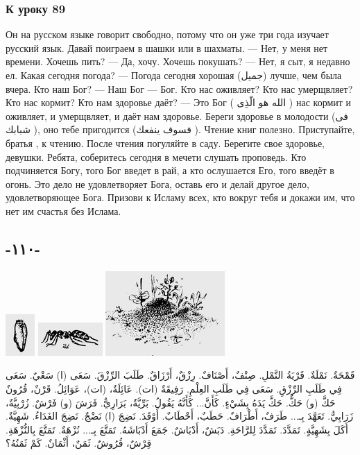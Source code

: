 \documentclass[a5paper]{article}
\begin{document}
\subsubsection[К уроку 89]{К уроку 89}
Он на русском языке говорит свободно, потому что он уже три года изучает русский язык. Давай поиграем в шашки или в шахматы. — Нет, у меня нет времени. Хочешь пить? — Да, хочу. Хочешь поку­шать? — Нет, я сыт, я недавно ел. Какая сегодня погода? — Погода сегодня хорошая (جميل) лучше, чем была вчера. Кто наш Бог? — Наш Бог — Бог. Кто нас оживляет? Кто нас умерщвляет? Кто нас кормит? Кто нам здоровье даёт? — Это Бог ( الله هو الّذِى ) нас кормит и оживляет, и умерщвляет, и даёт нам здоровье. Береги здоровье в молодости (فى شبابك ), оно тебе пригодится (فسوف ينفعك ). Чтение книг полезно. Приступайте, братья , к чтению. После чтения погуляйте в саду. Берегите свое здоровье, девушки. Ребята, соберитесь сегодня в мечети слушать проповедь. Кто подчиняется Богу, того Бог введет в рай, а кто ослушается Его, того введёт в огонь. Это дело не удовлетворяет Бога, оставь его и делай другое дело, удовлетворяющее Бога. Призови к Исламу всех, кто вокруг тебя и докажи им, что нет им счастья без Ислама.

\subsection{-١١٠-}
 \includegraphics[width=0.4374in,height=0.6252in]{MuhammadBagauddinlatinized-img283.png}   \includegraphics[width=0.9689in,height=0.5in]{MuhammadBagauddinlatinized-img284.png}   \includegraphics[width=1.7917in,height=1.2709in]{MuhammadBagauddinlatinized-img285.png} 

قَمْحَةٌ. نَمْلَةٌ. قَرْيَةُ النَّمْلِ. صِنْفٌ، أَصْنَافٌ. \newline
رِزْقٌ، أَرْزَاقٌ. طَلَبَ الرِّزْقَ. سَعَى (ا) سَعْيٌ. سَعَى فِي طَلَبِ الرِّزْقِ. سَعَى فِي طَلَبِ العِلْمِ. رَفِيقَةٌ (ات). عَائِلَةٌ، (ات)، عَوَائِلُ. قَرْنٌ، قُرُونٌ \newline
حَكَّ (و) حَكٌّ. حَكَّ يَدَهُ بِشَيْءٍ. كَأَنَّ... كَأَنَّهُ يَقُولُ. بَرِّيَّةٌ، بَرَارِيُّ. فَرَشَ (و) فَرْشٌ. زُرْبِيَّةٌ، زَرَابِيُّ. تَعَهَّدَ بِـ... طَرَفٌ، أَطْرَافٌ. حَطَبٌ، أَحْطَابٌ. أَوْقَدَ. نَضِجَ (ا) نَضْجٌ. نَضِجَ الغَدَاءُ. شَهِيَّةٌ. أَكَلَ بِشَهِيَّةٍ. تَمَدَّدَ. تَمَدَّدَ لِلرَّاحَةِ. دَبَشٌ، أَدْبَاشٌ. جَمَعَ أَدْبَاشَهُ. تَمَتَّعَ بِـ... نُزْهَةٌ. تَمَتَّعَ بِالنُّزْهَةِ. قِرْشٌ، قُرُوشٌ. ثَمَنٌ، أَثْمَانٌ. كَمْ ثَمَنُهُ؟
\end{document}
